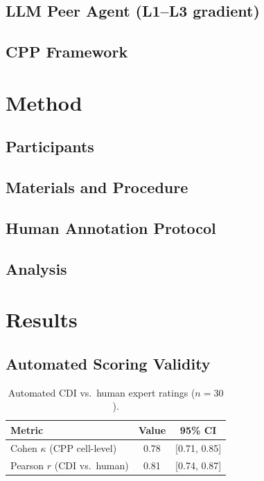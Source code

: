 \documentclass[review,12pt]{elsarticle}
\begin{document}
\subsection{LLM Peer Agent (L1--L3 gradient)}

\subsection{CPP Framework}

\section{Method}\label{sec:method}

\subsection{Participants}

\subsection{Materials and Procedure}

\subsection{Human Annotation Protocol}

\subsection{Analysis}

\section{Results}\label{sec:results}

\subsection{Automated Scoring Validity}
\begin{table}[h]
  \centering
  \caption{Automated CDI vs.\ human expert ratings ($n = 30$).}
  \begin{tabular}{lcc}
    \toprule
    Metric & Value & 95\% CI \\
    \midrule
    Cohen $\kappa$ (CPP cell-level) & 0.78 & [0.71, 0.85] \\
    Pearson $r$ (CDI vs.\ human)    & 0.81 & [0.74, 0.87] \\
    \bottomrule
  \end{tabular}
\end{table}
\end{document}
